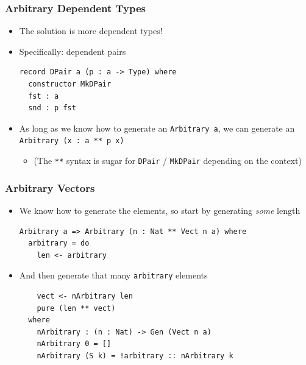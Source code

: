 \documentclass[compress,handout]{beamer}
\begin{document}
\begin{frame}[fragile]
  \frametitle{Arbitrary Dependent Types}

  \begin{itemize}
    \item<1-> The solution is more dependent types!
    \item<2-> Specifically: dependent pairs

    \begin{verbatim}
record DPair a (p : a -> Type) where
  constructor MkDPair
  fst : a
  snd : p fst
    \end{verbatim}

    \item<3-> As long as we know how to generate an {\textasciigrave
              \texttt{Arbitrary a}\textasciigrave}, we can generate
              an {\textasciigrave
              \texttt{Arbitrary (x : a ** p x)}\textasciigrave}
    \begin{itemize}
      \item<3-> (The \texttt{**} syntax is sugar for
                \texttt{DPair} / \texttt{MkDPair}
                depending on the context)
    \end{itemize}
  \end{itemize}

\end{frame}


\begin{frame}[fragile]
  \frametitle{Arbitrary Vectors}

  \begin{itemize}
  \item<1-> We know how to generate the elements, so start by generating
            \textit{some} length
            \begin{verbatim}
Arbitrary a => Arbitrary (n : Nat ** Vect n a) where
  arbitrary = do
    len <- arbitrary
            \end{verbatim}
  \item<2-> And then generate that many \texttt{arbitrary}
            elements
            \begin{verbatim}
    vect <- nArbitrary len
    pure (len ** vect)
  where
    nArbitrary : (n : Nat) -> Gen (Vect n a)
    nArbitrary 0 = []
    nArbitrary (S k) = !arbitrary :: nArbitrary k
            \end{verbatim}
  \vspace*{-5mm}
  \end{itemize}

\end{frame}
\end{document}
